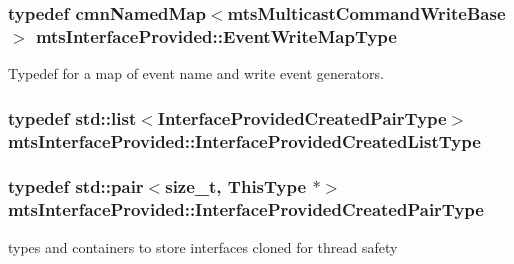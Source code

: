 \subsubsection[{Event\+Write\+Map\+Type}]{\setlength{\rightskip}{0pt plus 5cm}typedef {\bf cmn\+Named\+Map}$<${\bf mts\+Multicast\+Command\+Write\+Base}$>$ {\bf mts\+Interface\+Provided\+::\+Event\+Write\+Map\+Type}}\label{classmts_interface_provided_a98f1388a3c2119a1ae97f19302eeb550}
Typedef for a map of event name and write event generators. \hypertarget{classmts_interface_provided_ae16c05b551c38856866c199bc4551b98}{}
\subsubsection[{Interface\+Provided\+Created\+List\+Type}]{\setlength{\rightskip}{0pt plus 5cm}typedef std\+::list$<${\bf Interface\+Provided\+Created\+Pair\+Type}$>$ {\bf mts\+Interface\+Provided\+::\+Interface\+Provided\+Created\+List\+Type}\hspace{0.3cm}{\ttfamily [protected]}}\label{classmts_interface_provided_ae16c05b551c38856866c199bc4551b98}
\hypertarget{classmts_interface_provided_aa164de28d3de94ec992b6b93d5a8de5e}{}
\subsubsection[{Interface\+Provided\+Created\+Pair\+Type}]{\setlength{\rightskip}{0pt plus 5cm}typedef std\+::pair$<$size\+\_\+t, {\bf This\+Type} $\ast$$>$ {\bf mts\+Interface\+Provided\+::\+Interface\+Provided\+Created\+Pair\+Type}\hspace{0.3cm}{\ttfamily [protected]}}\label{classmts_interface_provided_aa164de28d3de94ec992b6b93d5a8de5e}
types and containers to store interfaces cloned for thread safety \hypertarget{classmts_interface_provided_a487e1de997186e03ed38d365592fd180}{}
